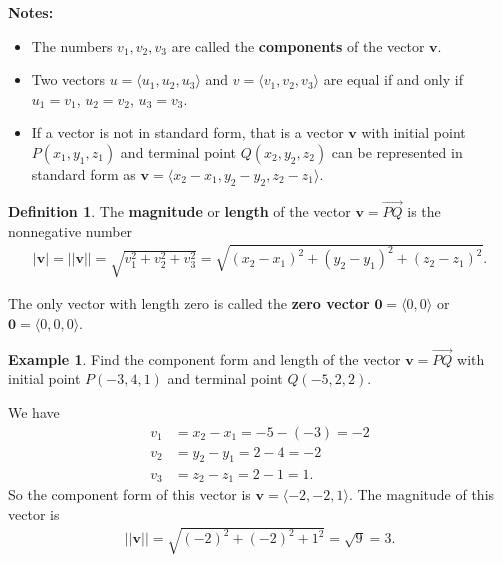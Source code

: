 \documentclass[12pt, letter]{article}
\theoremstyle{plain}
\numberwithin{theorem}{section}
\theoremstyle{definition}
\newtheorem{definition}[theorem]{Definition}
\newtheorem{example}[theorem]{Example}
\begin{document}
\bigskip

\textbf{Notes:}
\begin{itemize}
\item The numbers $v_1, v_2, v_3$ are called the \textbf{components} of the vector $\bm{v}$.
\item Two vectors $u=\langle u_1,u_2,u_3 \rangle$ and $v= \langle v_1,v_2,v_3\rangle$ are equal if and only if $u_1=v_1$, $u_2=v_2$, $u_3=v_3$.
\item If a vector is not in standard form, that is a vector $\bm{v}$ with initial point $P(x_1,y_1,z_1)$ and terminal point $Q(x_2,y_2,z_2)$ can be represented in standard form as $\bm{v} = \langle x_2-x_1, y_2-y_2, z_2-z_1 \rangle$.
\end{itemize}

\bigskip

\hrulefill

\bigskip

\begin{definition}
The \textbf{magnitude} or \textbf{length} of the vector $\bm{v} = \vec{PQ}$ is the nonnegative number
\begin{align*}
|\bm{v}| = ||\bm{v}|| = \sqrt{v_1^2+v_2^2+v_3^2} = \sqrt{(x_2-x_1)^2+(y_2-y_1)^2+(z_2-z_1)^2}.
\end{align*}
\end{definition}

\bigskip

The only vector with length zero is called the \textbf{zero vector} $\bm{0} = \langle 0, 0 \rangle$ or $\bm{0} = \langle 0, 0 ,0 \rangle$.

\bigskip

\hrulefill

\bigskip

\begin{example}
Find the component form and length of the vector $\bm{v} = \vec{PQ}$ with initial point $P(-3,4,1)$ and terminal point $Q(-5,2,2)$.\\

\smallskip

We have
\begin{align*}
v_1 &= x_2-x_1 = -5-(-3) = -2\\
v_2 &= y_2-y_1 = 2-4 = -2\\
v_3 &= z_2-z_1 = 2-1 = 1.
\end{align*}
So the component form of this vector is $\bm{v} = \langle -2, -2, 1 \rangle$. The magnitude of this vector is
\begin{align*}
||\bm{v}|| = \sqrt{(-2)^2+(-2)^2+1^2} = \sqrt{9} = 3.
\end{align*}
\end{example}
\end{document}
